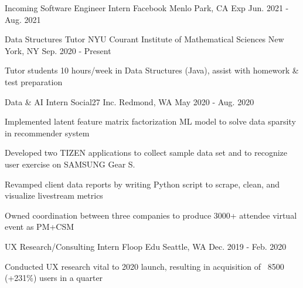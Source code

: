 

\begin{cventries}

  \cventry
    {Incoming Software Engineer Intern} %
    {Facebook} %
    {Menlo Park, CA} %
    {Exp Jun. 2021 - Aug. 2021} %
    {
      \begin{cvitems} %
      \end{cvitems}
    }

    \cventry
    {Data Structures Tutor} %
    {NYU Courant Institute of Mathematical Sciences} %
    {New York, NY} %
    {Sep. 2020 - Present} %
    {
      \begin{cvitems} %
        \item {Tutor students 10 hours/week in Data Structures (Java), assist with homework \& test preparation}
      \end{cvitems}
    }

  \cventry
    {Data \& AI Intern} %
    {Social27 Inc.} %
    {Redmond, WA} %
    {May 2020 - Aug. 2020} %
    {
      \begin{cvitems} %
        \item {Implemented latent feature matrix factorization ML model to solve data sparsity in recommender system}
        \item {Developed two TIZEN applications to collect sample data set and to recognize user exercise on SAMSUNG Gear S.}
        \item {Revamped client data reports by writing Python script to scrape, clean, and visualize livestream metrics}
        \item {Owned coordination between three companies to produce 3000+ attendee virtual event as PM+CSM}
      \end{cvitems}
    }

  \cventry
    {UX Research/Consulting Intern} %
    {Floop Edu} %
    {Seattle, WA} %
    {Dec. 2019 - Feb. 2020} %
    {
      \begin{cvitems} %
        \item {Conducted UX research vital to 2020 launch, resulting in acquisition of ~8500 (+231\%) users in a quarter}
      \end{cvitems}
    }

\end{cventries}